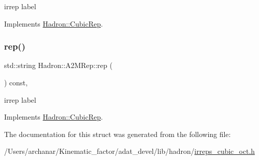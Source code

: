 irrep label 

Implements \mbox{\hyperlink{structHadron_1_1CubicRep_ac3eb63608803d44c68681f158e14eb1b}{Hadron\+::\+Cubic\+Rep}}.

\mbox{\label{structHadron_1_1A2MRep_ad219824d3a5220f47e6f3b38d2a60102}} 
\subsubsection{\texorpdfstring{rep()}{rep()}\hspace{0.1cm}{\footnotesize\ttfamily [2/2]}}
{\footnotesize\ttfamily std\+::string Hadron\+::\+A2\+M\+Rep\+::rep (\begin{DoxyParamCaption}{ }\end{DoxyParamCaption}) const\hspace{0.3cm}{\ttfamily [inline]}, {\ttfamily [virtual]}}

irrep label 

Implements \mbox{\hyperlink{structHadron_1_1CubicRep_ac3eb63608803d44c68681f158e14eb1b}{Hadron\+::\+Cubic\+Rep}}.



The documentation for this struct was generated from the following file\+:\begin{DoxyCompactItemize}
\item 
/\+Users/archanar/\+Kinematic\+\_\+factor/adat\+\_\+devel/lib/hadron/\mbox{\hyperlink{lib_2hadron_2irreps__cubic__oct_8h}{irreps\+\_\+cubic\+\_\+oct.\+h}}\end{DoxyCompactItemize}
